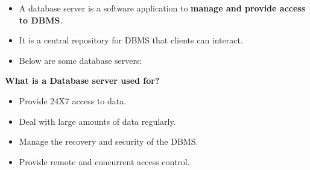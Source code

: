 \begin{flushleft}

	\begin{itemize}
		\item A database server is a software application to \textbf{manage and provide access to DBMS}. 
		\item It is a central repository for DBMS that clients can interact.
		\item Below are some database servers:
		
	\end{itemize}	
	
	\textbf{What is a Database server used for?}
	\begin{itemize}
		\item Provide 24X7 access to data.
		\item Deal with large amounts of data regularly.
		\item Manage the recovery and security of the DBMS.
		\item Provide remote and concurrent access control.
	\end{itemize}
	
	
	
\end{flushleft}

\newpage